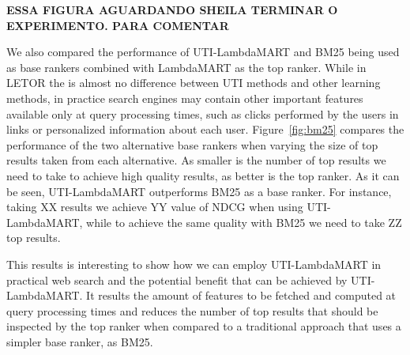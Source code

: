 \documentclass[preprint,review,10pt,3p]{elsarticle}
\begin{document}
{\bf
ESSA FIGURA AGUARDANDO SHEILA TERMINAR O EXPERIMENTO. PARA COMENTAR


We also compared the performance of  UTI-LambdaMART and BM25  being used as base rankers combined with LambdaMART as the top ranker. While in LETOR the is almost no difference between UTI methods and other learning methods, in practice search engines may contain other important features available only at query processing times, such as clicks performed by the users in links or personalized information about each user.  Figure~\ref{fig:bm25} compares the performance of the two alternative base rankers when varying the size of top results taken from each alternative. As smaller is the number of top results we need to take to achieve high quality results, as better is the top ranker. As it can be seen, UTI-LambdaMART outperforms  BM25 as a base ranker. For instance, taking XX results we achieve YY value of NDCG when using UTI-LambdaMART, while to achieve the same quality with BM25 we need to take ZZ top results.


This results is interesting to show how we can employ  UTI-LambdaMART in practical web search and the potential benefit that can be achieved by UTI-LambdaMART. It results the amount of features to be fetched and computed at query  processing times and reduces the number of top results that should be inspected by the top ranker when compared to a traditional approach that uses a simpler base ranker, as BM25.


}

\begin{figure}[h!]
\centering
\end{figure}
\end{document}

